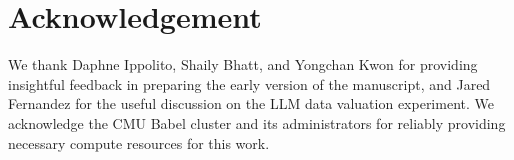 \section*{Acknowledgement}
We thank Daphne Ippolito, Shaily Bhatt, and Yongchan Kwon for providing insightful feedback in preparing the early version of the manuscript, and Jared Fernandez for the useful discussion on the LLM data valuation experiment. We acknowledge the CMU Babel cluster and its administrators for reliably providing necessary compute resources for this work.